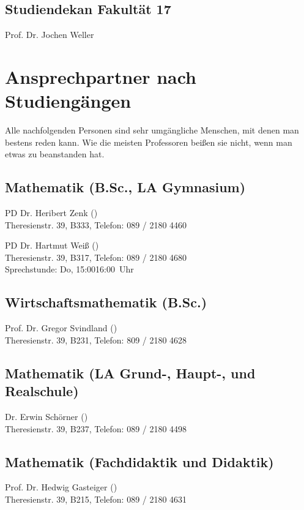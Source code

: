 \subsection*{Studiendekan Fakultät 17}
Prof. Dr. Jochen Weller \subjectList{\subjectP}

\section{Ansprechpartner nach Studiengängen}

Alle nachfolgenden Personen sind sehr umgängliche Menschen, mit denen
man bestens reden kann. Wie die meisten Professoren beißen sie nicht,
wenn man etwas zu beanstanden hat.

\subsection*{Mathematik (B.Sc., LA Gymnasium)\subjectList{\subjectM}}
PD Dr. Heribert Zenk ()\\
Theresienstr. 39, B333, Telefon: 089 / 2180 \emd{} 4460

PD Dr. Hartmut Weiß ()\\
Theresienstr. 39, B317, Telefon: 089 / 2180 \emd{} 4680\\
Sprechstunde: Do, 15:00\emd{}16:00~Uhr

\subsection*{Wirtschaftsmathematik (B.Sc.)\subjectList{\subjectW}}
Prof. Dr. Gregor Svindland ()\\
Theresienstr. 39, B231, Telefon: 809 / 2180 \emd{} 4628

\subsection*{Mathematik (LA Grund-, Haupt-, und Realschule)\subjectList{\subjectM}}
Dr. Erwin Schörner ()\\
Theresienstr. 39, B237, Telefon: 089 / 2180 \emd{} 4498

\subsection*{Mathematik (Fachdidaktik und Didaktik)\subjectList{\subjectM}}
Prof. Dr. Hedwig Gasteiger ()\\ %
Theresienstr. 39, B215, Telefon: 089 / 2180 \emd{} 4631

